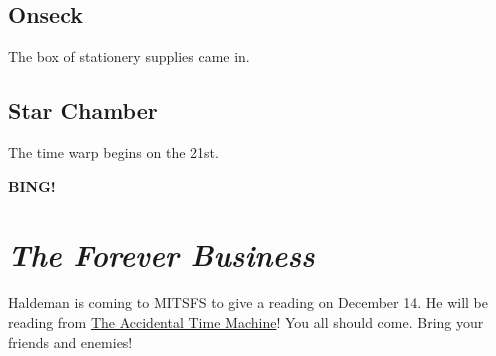 \documentclass[10pt]{article}
\newcommand{\bing}{{\bf BING!} }
\newcommand{\goto}[1]{\bing \vskip 12pt \section*{{\em{#1}}}}
\begin{document}
\subsection*{Onseck}

The box of stationery supplies came in.

\subsection*{Star Chamber}

The time warp begins on the 21st.










\goto{The Forever Business}

Haldeman is coming to MITSFS to give a reading on December 14. He will be reading from \underline{The Accidental Time Machine}! You all should come.  Bring your friends and enemies!
\end{document}
